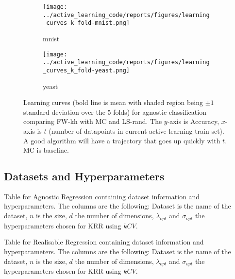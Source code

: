 \begin{figure}[htb]
  \label{figs:agnostic-classification-learning-curves}
  \centering
  \begin{subfigure}[b]{0.48\textwidth}
    \label{fig:learning-curve-agnostic-mnist}
    \texttt{[image: ../active\_learning\_code/reports/figures/learning\_curves\_k\_fold-mnist.png]}
    \caption{mnist}
  \end{subfigure}
  \begin{subfigure}[b]{0.48\textwidth}
    \label{fig:learning-curve-agnostic-yeast}
    \texttt{[image: ../active\_learning\_code/reports/figures/learning\_curves\_k\_fold-yeast.png]}
    \caption{yeast}
  \end{subfigure}
  \caption{Learning curves (bold line is mean with shaded region being \(\pm 1\) standard deviation over the 5 folds) for agnostic classification comparing FW-kh with MC and
    LS-rand. The \(y\)-axis is Accuracy, \(x\)-axis is \(t\)
    (number of datapoints in current active learning train set). A good
    algorithm will have a trajectory that goes up quickly with \(t\). MC is baseline.}
\end{figure}

\FloatBarrier

\subsection{Datasets and Hyperparameters}

\begin{table}[H]
  \centering
  \vspace{0.5cm}
  \caption{Table for Agnostic Regression containing dataset information and hyperparameters.
    The columns are the following: Dataset is the name of the dataset, \(n\) is the size, \(d\) the number of
    dimensions, \(\lambda_{opt}\) and \(\sigma_{opt}\) the hyperparameters chosen
    for KRR using \(kCV\).}
\end{table}

\vspace{2cm}
\FloatBarrier

\begin{table}[H]
  \centering
  \vspace{0.5cm}
  \caption{Table for Realisable Regression containing dataset information and hyperparameters.
    The columns are the following: Dataset is the name of the dataset, \(n\) is the size, \(d\) the number of
    dimensions, \(\lambda_{opt}\) and \(\sigma_{opt}\) the hyperparameters chosen
    for KRR using \(kCV\).}
\end{table}

